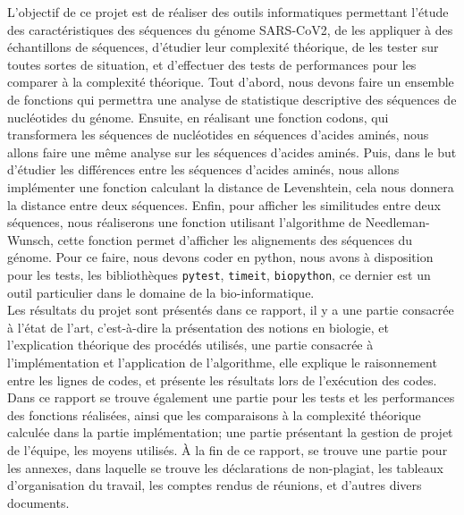\documentclass[12pt]{article}
\begin{document}
L'objectif de ce projet est de réaliser des outils informatiques permettant l'étude des caractéristiques des séquences du génome SARS-CoV2, de les appliquer à des échantillons de séquences, d'étudier leur complexité théorique, de les tester sur toutes sortes de situation, et d'effectuer des tests de performances pour les comparer à la complexité théorique. Tout d'abord, nous devons faire un ensemble de fonctions qui permettra une analyse de statistique descriptive des séquences de nucléotides du génome. Ensuite, en réalisant une fonction codons, qui transformera les séquences de nucléotides en séquences d'acides aminés, nous allons faire une même analyse sur les séquences d'acides aminés. Puis, dans le but d'étudier les différences entre les séquences d'acides aminés, nous allons implémenter une fonction calculant la distance de Levenshtein, cela nous donnera la distance entre deux séquences. Enfin, pour afficher les similitudes entre deux séquences, nous réaliserons une fonction utilisant l'algorithme de Needleman-Wunsch, cette fonction permet d'afficher les alignements des séquences du génome. Pour ce faire, nous devons coder en \textsf{python}, nous avons à disposition pour les tests, les bibliothèques \texttt{pytest}, \texttt{timeit}, \texttt{biopython}, ce dernier est un outil particulier dans le domaine de la bio-informatique.\\

Les résultats du projet sont présentés dans ce rapport, il y a une partie consacrée à l'état de l'art, c'est-à-dire la présentation des notions en biologie, et l'explication théorique des procédés utilisés, une partie consacrée à l'implémentation et l'application de l'algorithme, elle explique le raisonnement entre les lignes de codes, et présente les résultats lors de l'exécution des codes. Dans ce rapport se trouve également une partie pour les tests et les performances des fonctions réalisées, ainsi que les comparaisons à la complexité théorique calculée dans la partie implémentation; une partie présentant la gestion de projet de l'équipe, les moyens utilisés. À la fin de ce rapport, se trouve une partie pour les annexes, dans laquelle se trouve les déclarations de non-plagiat, les tableaux d'organisation du travail, les comptes rendus de réunions, et d'autres divers documents.

\newpage 
\end{document}
